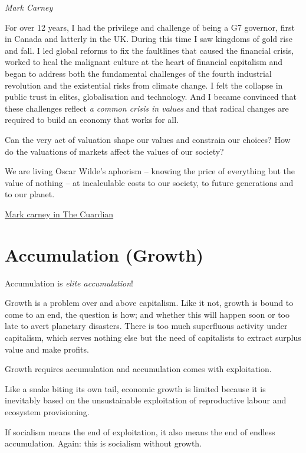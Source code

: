 \documentclass[
]{book}
\begin{document}
\emph{Mark Carney}

For over 12 years, I had the privilege and challenge of being a G7 governor, first in Canada and latterly in the UK. During this time I saw kingdoms of gold rise and fall. I led global reforms to fix the faultlines that caused the financial crisis, worked to heal the malignant culture at the heart of financial capitalism and began to address both the fundamental challenges of the fourth industrial revolution and the existential risks from climate change. I felt the collapse in public trust in elites, globalisation and technology. And I became convinced that these challenges reflect \emph{a common crisis in values} and that radical changes are required to build an economy that works for all.

Can the very act of valuation shape our values and constrain our choices? How do the valuations of markets affect the values of our society?

We are living Oscar Wilde's aphorism -- knowing the price of everything but the value of nothing -- at incalculable costs to our society, to future generations and to our planet.

\href{https://www.theguardian.com/business/2021/mar/13/crisis-in-values-exclusive-extract-mark-carneys-book}{Mark carney in The Cuardian}

\hypertarget{accumulation-growth}{%
\chapter{Accumulation (Growth)}\label{accumulation-growth}}

Accumulation is \emph{elite accumulation}!

Growth is a problem over and above capitalism.
Like it not, growth is bound to come to an end,
the question is how;
and whether this will happen soon or too late to avert planetary disasters.
There is too much superfluous activity under capitalism,
which serves nothing else but the need of capitalists
to extract surplus value and make profits.

Growth requires accumulation and accumulation comes with exploitation.

Like a snake biting its own tail, economic growth is limited because it is inevitably based on the unsustainable exploitation of reproductive labour and ecosystem provisioning.

If socialism means the end of exploitation,
it also means the end of endless accumulation.
Again: this is socialism without growth.
\end{document}
